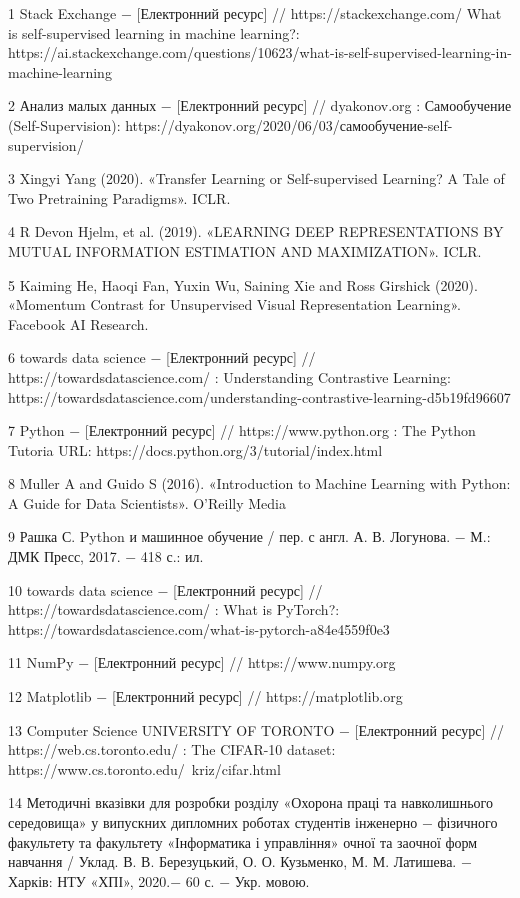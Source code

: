 
\hspace*{26pt} 
1 Stack Exchange $-$ [Електронний ресурс] // https://stackexchange.com/ What is self-supervised learning in machine learning?: https://ai.stackexchange.com/questions/10623/what-is-self-supervised-learning-in-machine-learning

2 Анализ малых данных $-$ [Електронний ресурс] // dyakonov.org : Самообучение (Self-Supervision): https://dyakonov.org/2020/06/03/самообучение-self-supervision/

3 Xingyi Yang (2020). «Transfer Learning or Self-supervised Learning? A Tale of Two Pretraining Paradigms». ICLR.

4 R Devon Hjelm, et al. (2019). «LEARNING DEEP REPRESENTATIONS BY MUTUAL INFORMATION ESTIMATION AND MAXIMIZATION». ICLR.

5 Kaiming He, Haoqi Fan, Yuxin Wu, Saining Xie and Ross Girshick (2020). «Momentum Contrast for Unsupervised Visual Representation Learning». Facebook AI Research.

6 towards data science $-$ [Електронний ресурс] // https://towardsdatascience.com/ : Understanding Contrastive Learning: https://towardsdatascience.com/understanding-contrastive-learning-d5b19fd96607

7 Python $-$ [Електронний ресурс] // https://www.python.org :  The Python Tutoria URL: https://docs.python.org/3/tutorial/index.html

8 Muller A and Guido S (2016). «Introduction to Machine Learning with Python: A Guide for Data Scientists». O'Reilly Media

9 Рашка С. Python и машинное обучение / пер. с англ. А. В. Логунова. $-$ М.: ДМК Пресс, 2017. $-$ 418 с.: ил.

10 towards data science $-$ [Електронний ресурс] // https://towardsdatascience.com/ : What is PyTorch?: https://towardsdatascience.com/what-is-pytorch-a84e4559f0e3

11 NumPy $-$ [Електронний ресурс] // https://www.numpy.org

12 Matplotlib $-$ [Електронний ресурс] // https://matplotlib.org

13 Computer Science UNIVERSITY OF TORONTO $-$ [Електронний ресурс] // https://web.cs.toronto.edu/ : The CIFAR-10 dataset: https://www.cs.toronto.edu/~kriz/cifar.html 

14 Методичні вказівки для розробки розділу «Охорона праці та навколишнього середовища» у випускних дипломних роботах студентів інженерно $-$ фізичного факультету та факультету «Інформатика і управління» очної та заочної форм навчання / Уклад. В. В. Березуцький, О. О. Кузьменко, М. М. Латишева. $-$ Харків: НТУ «ХПІ», 2020.$-$ 60 с. $-$ Укр. мовою.

